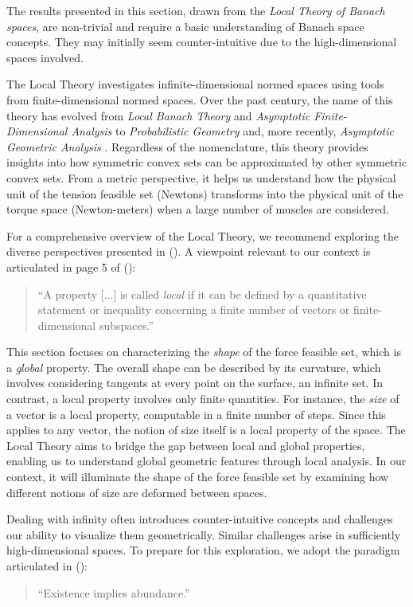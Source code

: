 The results presented in this section, drawn from the \emph{Local Theory of Banach spaces}, are non-trivial and require a basic understanding of Banach space concepts. They may initially seem counter-intuitive due to the high-dimensional spaces involved.

The Local Theory investigates infinite-dimensional normed spaces using tools from finite-dimensional normed spaces.  Over the past century, the name of this theory has evolved from \emph{Local Banach Theory} and \emph{Asymptotic Finite-Dimensional Analysis} to \emph{Probabilistic Geometry} and, more recently, \emph{Asymptotic Geometric Analysis} \cite{artstein-avidanAsymptoticGeometricAnalysis2015}. Regardless of the nomenclature, this theory provides insights into how symmetric convex sets can be approximated by other symmetric convex sets. From a metric perspective, it helps us understand how the physical unit of the tension feasible set (Newtons) transforms into the physical unit of the torque space (Newton-meters) when a large number of muscles are considered.

For a comprehensive overview of the Local Theory, we recommend exploring the diverse perspectives presented in (\cite{pietschWhatLocalTheory1999}). A viewpoint relevant to our context is articulated in page 5 of (\cite{tomczak-jaegermannBanachMazurDistancesFinitedimensional1989}):
\begin{quote}
  ``A property [...] is called \emph{local} if it can be defined by a quantitative statement or inequality concerning a finite number of vectors or finite-dimensional subspaces.''
\end{quote}

This section focuses on characterizing the \emph{shape} of the force feasible set, which is a \emph{global} property. The overall shape can be described by its curvature, which involves considering tangents at every point on the surface, an infinite set. In contrast, a local property involves only finite quantities. For instance, the \emph{size} of a vector is a local property, computable in a finite number of steps. Since this applies to any vector, the notion of size itself is a local property of the space. The Local Theory aims to bridge the gap between local and global properties, enabling us to understand global geometric features through local analysis. In our context, it will illuminate the shape of the force feasible set by examining how different notions of size are deformed between spaces.

Dealing with infinity often introduces counter-intuitive concepts and challenges our ability to visualize them geometrically. Similar challenges arise in sufficiently high-dimensional spaces. To prepare for this exploration, we adopt the paradigm articulated in (\cite{milmanRegularRandomSections2021}):
\begin{quotation}
  \centering
  ``Existence implies abundance.''
\end{quotation}

